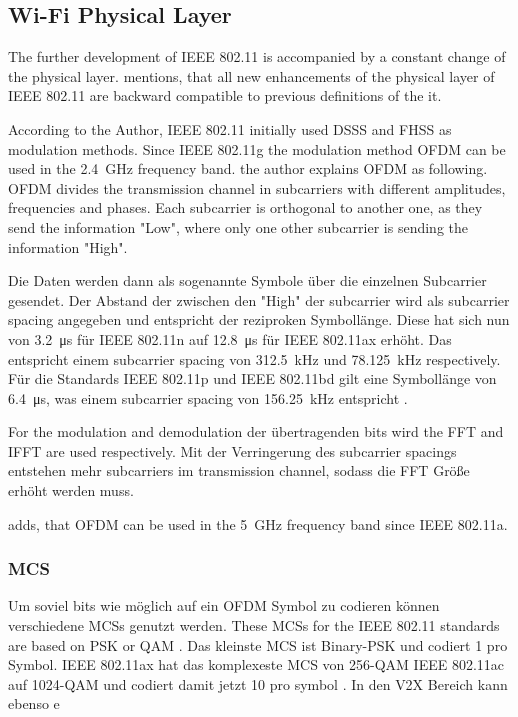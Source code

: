 \subsection*{Wi-Fi Physical Layer}
The further development of IEEE 802.11 is accompanied by a constant change of the physical layer. \textcite{sauter_wireless_2022} mentions, that all new enhancements of the physical layer of IEEE 802.11 are backward compatible to previous definitions of the it.

According to the Author, IEEE 802.11 initially used DSSS and FHSS as modulation methods.
Since IEEE 802.11g the modulation method \ac{OFDM} can be used in the \SI{2.4}{\giga\hertz} frequency band. the author explains \ac{OFDM} as following. \ac{OFDM} divides the transmission channel in subcarriers with different amplitudes, frequencies and phases. Each subcarrier is orthogonal to another one, as they send the information "Low", where only one other subcarrier is sending the information "High". 

Die Daten werden dann als sogenannte Symbole über die einzelnen Subcarrier gesendet. Der Abstand der zwischen den "High" der subcarrier wird als subcarrier spacing angegeben und entspricht der reziproken Symbollänge. Diese hat sich nun von \SI{3.2}{\micro\second} für IEEE 802.11n auf \SI{12.8}{\micro\second} für IEEE 802.11ax erhöht. Das entspricht einem subcarrier spacing von \SI{312,5}{\kilo\hertz} und \SI{78.125}{\kilo\hertz} respectively. 
Für die Standards IEEE 802.11p und IEEE 802.11bd gilt eine Symbollänge von \SI{6.4}{\micro\second}, was einem subcarrier spacing von \SI{156.25}{\kilo\hertz} entspricht \cite{jacobs}.

For the modulation and demodulation der übertragenden bits wird the FFT and IFFT are used respectively. Mit der Verringerung des subcarrier spacings entstehen mehr subcarriers im transmission channel, sodass die FFT Größe erhöht werden muss. 

\textcite{kauffels_wireless_2002} adds, that \ac{OFDM} can be used in the \SI{5}{\giga\hertz} frequency band since IEEE 802.11a. 

\subsubsection*{\acl{MCS}}

Um soviel bits wie möglich auf ein OFDM Symbol zu codieren können verschiedene \ac{MCS}s genutzt werden.   
These \ac{MCS}s for the IEEE 802.11 standards are based on \ac{PSK} or \ac{QAM} \cite{kauffels_wireless_2002}. 
Das kleinste \ac{MCS} ist Binary-\ac{PSK} und codiert \SI{1}{\bit} pro Symbol. IEEE 802.11ax hat das komplexeste \ac{MCS} von \num{256}-QAM IEEE 802.11ac auf \num{1024}-QAM und codiert damit jetzt \SI{10}{\bit} pro symbol \cite{axChallenge}.
In den \ac{V2X} Bereich kann ebenso e


